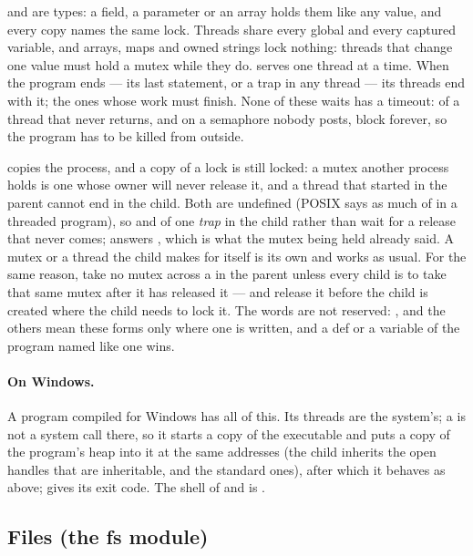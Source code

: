 \noindent {} and  are types: a field, a parameter or an
array holds them like any value, and every copy names the same lock.
Threads share every global and every captured variable, and arrays,
maps and owned strings lock nothing: threads that change one value must
hold a mutex while they do.  serves one thread at a time.
When the program ends --- its last statement,  or a trap in any
thread --- its threads end with it;  the ones whose work must
finish. None of these waits has a timeout:  of a thread that never
returns, and  on a semaphore nobody posts, block forever, so the
program has to be killed from outside.

 copies the process, and a copy of a lock is still locked: a
mutex another process holds is one whose owner will never release it, and
a thread that started in the parent cannot end in the child. Both are
undefined (POSIX says as much of  in a threaded program), so
 and  of one \emph{trap} in the child rather than wait
for a release that never comes;  answers , which is
what the mutex being held already said. A mutex or a thread the child
makes for itself is its own and works as usual. For the same reason, take
no mutex across a  in the parent unless every child is to take
that same mutex after it has released it --- and release it before the
child is created where the child needs to lock it. The words are not
reserved: ,  and the others
mean these forms only where one is written, and a def or a variable of
the program named like one wins.

\paragraph{On Windows.} A program compiled for Windows has all of this. Its
threads are the system's; a  is not a system call there, so it starts
a copy of the executable and puts a copy of the program's heap into it at the
same addresses (the child inherits the open handles that are inheritable, and
the standard ones), after which it behaves as above;  gives its
exit code. The shell of  and  is .

\subsection{Files (the fs module)}
\label{sec:builtin-fs}

